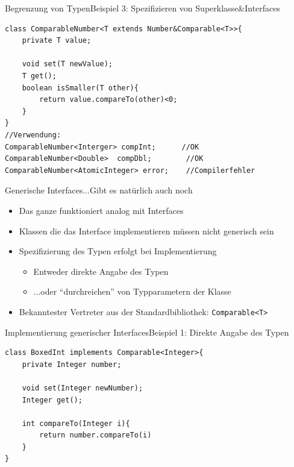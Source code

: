 \begin{frame}[fragile]{Begrenzung von Typen}{Beispiel 3: Spezifizieren von Superklasse\&Interfaces}
\lstset{style=javacode}
\begin{lstlisting}
class ComparableNumber<T extends Number&Comparable<T>>{
    private T value;
    
    void set(T newValue);
    T get();
    boolean isSmaller(T other){
        return value.compareTo(other)<0;
    }
}
//Verwendung:
ComparableNumber<Interger> compInt;      //OK
ComparableNumber<Double>  compDbl;        //OK
ComparableNumber<AtomicInteger> error;    //Compilerfehler
\end{lstlisting}
\end{frame}


\begin{frame}{Generische Interfaces}{...Gibt es natürlich auch noch}
    \begin{itemize}
        \item Das ganze funktioniert analog mit Interfaces
        \item Klassen die das Interface implementieren müssen nicht generisch sein
        \item Spezifizierung des Typen erfolgt bei Implementierung
        \begin{itemize}
            \item Entweder direkte Angabe des Typen
            \item ...oder "`durchreichen"' von Typparametern der Klasse
        \end{itemize}
        \item Bekanntester Vertreter aus der Standardbibliothek: \texttt{Comparable<T>}
    \end{itemize}
\end{frame}

\begin{frame}[fragile]{Implementierung generischer Interfaces}{Beispiel 1: Direkte Angabe des Typen}
\lstset{style=javacode}
\begin{lstlisting}
class BoxedInt implements Comparable<Integer>{
    private Integer number;
    
    void set(Integer newNumber);
    Integer get();
    
    int compareTo(Integer i){
        return number.compareTo(i)
    }
}
\end{lstlisting}
\end{frame}

